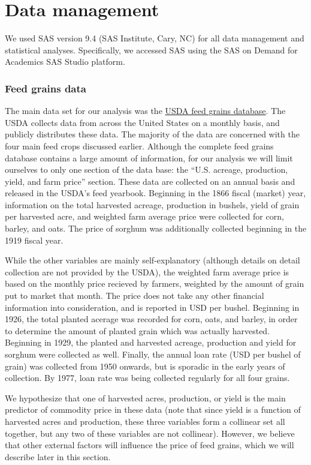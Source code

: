 \documentclass[11pt]{article}
\begin{document}
\section*{Data management}

We used SAS version 9.4 (SAS Institute, Cary, NC) for all data management and
statistical analyses. Specifically, we accessed SAS using the SAS on Demand for
Academics SAS Studio platform.

\subsubsection*{Feed grains data}

The main data set for our analysis was the
\href{https://www.ers.usda.gov/data-products/feed-grains-database/}{USDA feed
	grains database}. The USDA collects data from across the United States on a
monthly basis, and publicly distributes these data. The majority of the data
are concerned with the four main feed crops discussed earlier. Although the
complete feed grains database contains a large amount of information, for our
analysis we will limit ourselves to only one section of the data base: the
``U.S. acreage, production, yield, and farm price'' section. These data are
collected on an annual basis and released in the USDA's feed yearbook.
Beginning in the 1866 fiscal (market) year, information on the total harvested
acreage, production in bushels, yield of grain per harvested acre, and weighted
farm average price were collected for corn, barley, and oats. The price of
sorghum was additionally collected beginning in the 1919 fiscal year.

While the other variables are mainly self-explanatory (although details on
detail collection are not provided by the USDA), the weighted farm
average price is based on the monthly price recieved by farmers, weighted by
the amount of grain put to market that month. The price does not take any other
financial information into consideration, and is reported in USD per bushel.
Beginning in 1926, the total planted acerage was recorded for corn, oats, and
barley, in order to determine the amount of planted grain which was actually
harvested. Beginning in 1929, the planted and harvested acreage, production and
yield for sorghum were collected as well. Finally, the annual loan rate (USD
per bushel of grain) was collected from 1950 onwards, but is sporadic in the
early years of collection. By 1977, loan rate was being collected regularly for
all four grains.

We hypothesize that one of harvested acres, production, or yield is the main
predictor of commodity price in these data (note that since yield is a function
of harvested acres and production, these three variables form a collinear set
all together, but any two of these variables are not collinear). However, we
believe that other external factors will influence the price of feed grains,
which we will describe later in this section.
\end{document}
